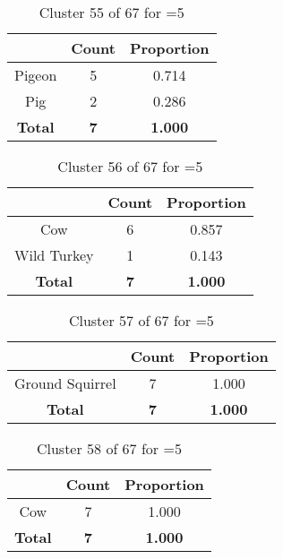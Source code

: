 \begin{table}[ht!]
\centering
\begin{tabular}{|c|c|c|}
\hline
\bf \Spec{} &\bf Count &\bf Proportion\\ \hline \hline
Pigeon & 5 & 0.714\\ \hline
Pig & 2 & 0.286\\ \hline
\hline
\bf Total & \bf 7 & \bf 1.000\\ \hline
\end{tabular}
\label{tab:cluster:55:5}
\caption{Cluster 55 of 67 for \minneigh{}=5}
\end{table}

\begin{table}[ht!]
\centering
\begin{tabular}{|c|c|c|}
\hline
\bf \Spec{} &\bf Count &\bf Proportion\\ \hline \hline
Cow & 6 & 0.857\\ \hline
Wild Turkey & 1 & 0.143\\ \hline
\hline
\bf Total & \bf 7 & \bf 1.000\\ \hline
\end{tabular}
\label{tab:cluster:56:5}
\caption{Cluster 56 of 67 for \minneigh{}=5}
\end{table}

\begin{table}[ht!]
\centering
\begin{tabular}{|c|c|c|}
\hline
\bf \Spec{} &\bf Count &\bf Proportion\\ \hline \hline
Ground Squirrel & 7 & 1.000\\ \hline
\hline
\bf Total & \bf 7 & \bf 1.000\\ \hline
\end{tabular}
\label{tab:cluster:57:5}
\caption{Cluster 57 of 67 for \minneigh{}=5}
\end{table}

\begin{table}[ht!]
\centering
\begin{tabular}{|c|c|c|}
\hline
\bf \Spec{} &\bf Count &\bf Proportion\\ \hline \hline
Cow & 7 & 1.000\\ \hline
\hline
\bf Total & \bf 7 & \bf 1.000\\ \hline
\end{tabular}
\label{tab:cluster:58:5}
\caption{Cluster 58 of 67 for \minneigh{}=5}
\end{table}

